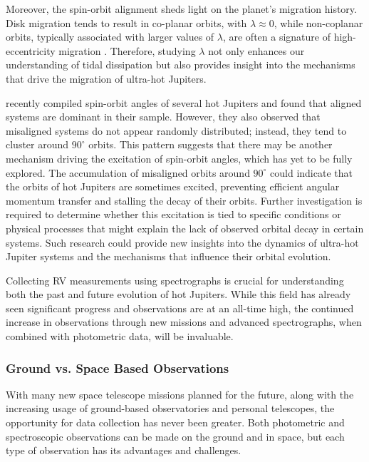 \documentclass[oneside,12pt]{amsart}
\numberwithin{page}{section}
\begin{document}
Moreover, the spin-orbit alignment sheds light on the planet's migration history. Disk migration tends to result in co-planar orbits, with $\lambda \approx 0$, while non-coplanar orbits, typically associated with larger values of $\lambda$, are often a signature of high-eccentricity migration \citep{triaud2017rossiter}. Therefore, studying $\lambda$ not only enhances our understanding of tidal dissipation but also provides insight into the mechanisms that drive the migration of ultra-hot Jupiters.

\citet{attia2023dream} recently compiled spin-orbit angles of several hot Jupiters and found that aligned systems are dominant in their sample. However, they also observed that misaligned systems do not appear randomly distributed; instead, they tend to cluster around $90^\circ$ orbits. This pattern suggests that there may be another mechanism driving the excitation of spin-orbit angles, which has yet to be fully explored. The accumulation of misaligned orbits around $90^\circ$ could indicate that the orbits of hot Jupiters are sometimes excited, preventing efficient angular momentum transfer and stalling the decay of their orbits. Further investigation is required to determine whether this excitation is tied to specific conditions or physical processes that might explain the lack of observed orbital decay in certain systems. Such research could provide new insights into the dynamics of ultra-hot Jupiter systems and the mechanisms that influence their orbital evolution.

Collecting RV measurements using spectrographs is crucial for understanding both the past and future evolution of hot Jupiters. While this field has already seen significant progress and observations are at an all-time high, the continued increase in observations through new missions and advanced spectrographs, when combined with photometric data, will be invaluable.


\subsubsection{Ground vs. Space Based Observations}

With many new space telescope missions planned for the future, along with the increasing usage of ground-based observatories and personal telescopes, the opportunity for data collection has never been greater. Both photometric and spectroscopic observations can be made on the ground and in space, but each type of observation has its advantages and challenges.
\end{document}
